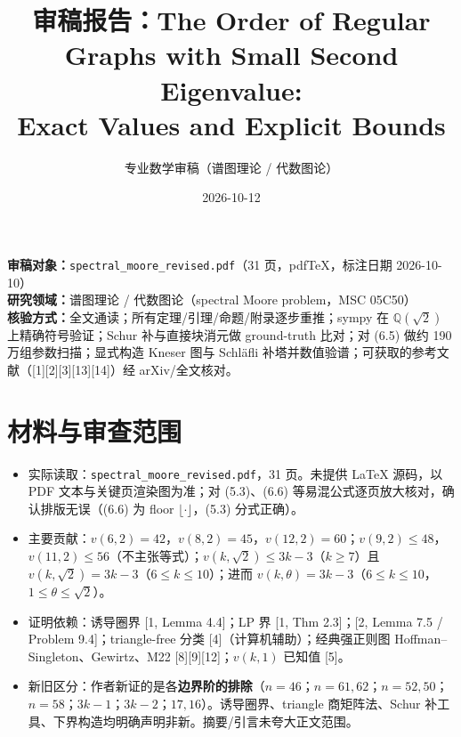 \documentclass[UTF8,11pt]{ctexart}
\title{审稿报告：The Order of Regular Graphs with Small Second Eigenvalue:\\ Exact Values and Explicit Bounds}
\author{专业数学审稿（谱图理论 / 代数图论）}
\date{2026-10-12}
\begin{document}
\maketitle

\noindent\textbf{审稿对象：}\texttt{spectral\_moore\_revised.pdf}（31 页，pdfTeX，标注日期 2026-10-10）\\
\textbf{研究领域：}谱图理论 / 代数图论（spectral Moore problem，MSC 05C50）\\
\textbf{核验方式：}全文通读；所有定理/引理/命题/附录逐步重推；sympy 在 $\mathbb{Q}(\sqrt2)$ 上精确符号验证；Schur 补与直接块消元做 ground-truth 比对；对 (6.5) 做约 190 万组参数扫描；显式构造 Kneser 图与 Schl\"afli 补塔并数值验谱；可获取的参考文献（[1][2][3][13][14]）经 arXiv/全文核对。

\section{材料与审查范围}
\begin{itemize}
\item 实际读取：\texttt{spectral\_moore\_revised.pdf}，31 页。未提供 LaTeX 源码，以 PDF 文本与关键页渲染图为准；对 (5.3)、(6.6) 等易混公式逐页放大核对，确认排版无误（(6.6) 为 floor $\lfloor\cdot\rfloor$，(5.3) 分式正确）。
\item 主要贡献：$v(6,2)=42$，$v(8,2)=45$，$v(12,2)=60$；$v(9,2)\le48$，$v(11,2)\le56$（不主张等式）；$v(k,\sqrt2)\le3k-3$（$k\ge7$）且 $v(k,\sqrt2)=3k-3$（$6\le k\le10$）；进而 $v(k,\theta)=3k-3$（$6\le k\le10$，$1\le\theta\le\sqrt2$）。
\item 证明依赖：诱导圈界 [1, Lemma 4.4]；LP 界 [1, Thm 2.3]；[2, Lemma 7.5 / Problem 9.4]；triangle-free 分类 [4]（计算机辅助）；经典强正则图 Hoffman--Singleton、Gewirtz、M22 [8][9][12]；$v(k,1)$ 已知值 [5]。
\item 新旧区分：作者新证的是各\textbf{边界阶的排除}（$n=46$；$n=61,62$；$n=52,50$；$n=58$；$3k-1$；$3k-2$；$17,16$）。诱导圈界、triangle 商矩阵法、Schur 补工具、下界构造均明确声明非新。摘要/引言未夸大正文范围。
\end{itemize}
\end{document}
